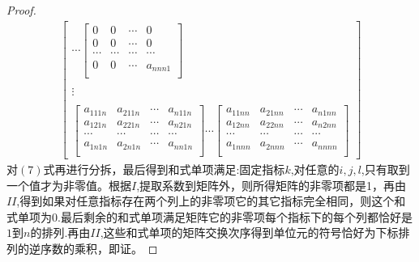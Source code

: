 \documentclass[twoside,a4paper,CCT]{cctart}   %
\begin{document}
\begin{proof}
\begin{equation}
\begin{aligned}
\begin{bmatrix}
\cdots
 \begin{bmatrix}
   0& 0&\cdots&0\\
   0& 0&\cdots&0\\
  \cdots& \cdots&\cdots&\cdots \\
0& 0&\cdots&a_{nnn1}\\
\end{bmatrix}\\
\\
\vdots\\
\\
\begin{bmatrix}
  a_{111n}& a_{211n}&\cdots&a_{n11n}\\
  a_{121n}& a_{221n}&\cdots&a_{n21n}\\
  \cdots& \cdots&\cdots&\cdots \\
  a_{1n1n}& a_{2n1n}&\cdots&a_{nn1n}\\
  \end{bmatrix}
\cdots
\begin{bmatrix}
  a_{11nn}& a_{21nn}&\cdots&a_{n1nn}\\
  a_{12nn}& a_{22nn}&\cdots&a_{n2nn}\\
  \cdots& \cdots&\cdots&\cdots \\
   a_{1nnn}& a_{2nnn}&\cdots&a_{nnnn}\\
\end{bmatrix}
\end{bmatrix}
\end{aligned}
\end{equation}
对$(7)$式再进行分拆，最后得到和式单项满足:固定指标$k$,对任意的$i,j,l$,只有取到一个值才为非零值。根据$I$,提取系数到矩阵外，则所得矩阵的非零项都是1，再由$II$,得到如果对任意指标存在两个列上的非零项它的其它指标完全相同，则这个和式单项为0.最后剩余的和式单项满足矩阵它的非零项每个指标下的每个列都恰好是$1$到$n$的排列.再由$II$,这些和式单项的矩阵交换次序得到单位元的符号恰好为下标排列的逆序数的乘积，即证。
\end{proof}
\end{document}
